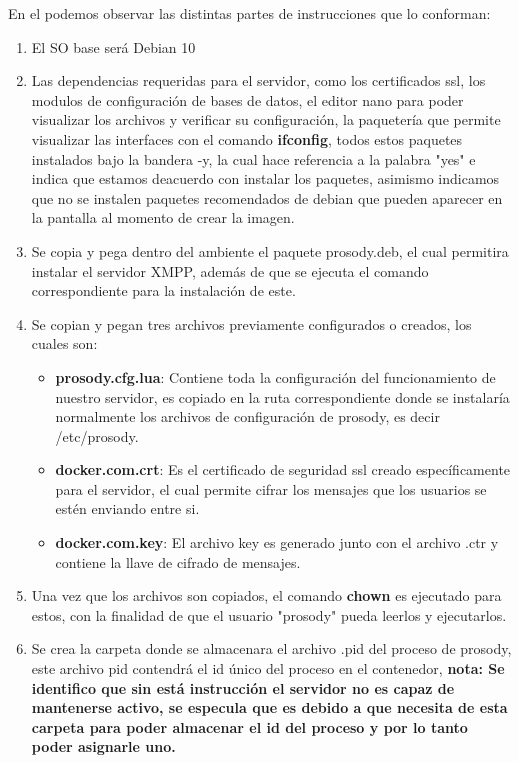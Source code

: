 \documentclass[10pt,letterpaper]{article}
\begin{document}
En el podemos observar las distintas partes de instrucciones que lo conforman:
\begin{enumerate}
\item El SO base será Debian 10

\item Las dependencias requeridas para el servidor, como los certificados ssl, los modulos de configuración de bases de datos, el editor nano para poder visualizar los archivos y verificar su configuración, la paquetería que permite visualizar las interfaces con el comando \textbf{ifconfig}, todos estos paquetes instalados bajo la bandera -y, la cual hace referencia a la palabra "yes" e indica que estamos deacuerdo con instalar los paquetes, asimismo indicamos que no se instalen paquetes recomendados de debian que pueden aparecer en la pantalla al momento de crear la imagen.

\item Se copia y pega dentro del ambiente el paquete prosody.deb, el cual permitira instalar el servidor XMPP, además de que se ejecuta el comando correspondiente para la instalación de este.

\item Se copian y pegan tres archivos previamente configurados o creados, los cuales son:
	\begin{itemize}
	\item \textbf{prosody.cfg.lua}: Contiene toda la configuración del funcionamiento de nuestro servidor, es copiado en la ruta correspondiente donde se instalaría normalmente los archivos de configuración de prosody, es decir /etc/prosody.
	\item \textbf{docker.com.crt}: Es el certificado de seguridad ssl creado específicamente para el servidor, el cual permite cifrar los mensajes que los usuarios se estén enviando entre si.
	\item \textbf{docker.com.key}: El archivo key es generado junto con el archivo .ctr y contiene la llave de cifrado de mensajes.
	\end{itemize}

\item Una vez que los archivos son copiados, el comando \textbf{chown} es ejecutado para estos, con la finalidad de que el usuario "prosody" pueda leerlos y ejecutarlos.

\item Se crea la carpeta donde se almacenara el archivo .pid del proceso de prosody, este archivo pid contendrá el id único del proceso en el contenedor, \textbf{nota: Se identifico que sin está instrucción el servidor no es capaz de mantenerse activo, se especula que es debido a que necesita de esta carpeta para poder almacenar el id del proceso y por lo tanto poder asignarle uno.}


\end{enumerate}
\end{document}
